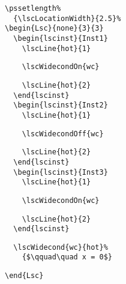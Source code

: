 \documentclass{article}
\begin{document}
\begin{center}%
\begin{minipage}{0.5\textwidth}
\end{minipage}
\hfill
\begin{minipage}{0.39\textwidth}%
\small%
{\gray\begin{verbatim}
\pssetlength%
  {\lscLocationWidth}{2.5}%
\begin{Lsc}{none}{3}{3}
  \begin{lscinst}{Inst1}
    \lscLine{hot}{1}
\end{verbatim}}%
\verbunskip%
{\begin{verbatim}
    \lscWidecondOn{wc}
\end{verbatim}}%
\verbunskip%
{\gray\begin{verbatim}
    \lscLine{hot}{2}
  \end{lscinst}
  \begin{lscinst}{Inst2}
    \lscLine{hot}{1}
\end{verbatim}}%
\verbunskip%
{\begin{verbatim}
    \lscWidecondOff{wc}
\end{verbatim}}%
\verbunskip%
{\gray\begin{verbatim}
    \lscLine{hot}{2}
  \end{lscinst}
  \begin{lscinst}{Inst3}
    \lscLine{hot}{1}
\end{verbatim}}%
\verbunskip%
{\begin{verbatim}
    \lscWidecondOn{wc}
\end{verbatim}}%
\verbunskip%
{\gray\begin{verbatim}
    \lscLine{hot}{2}
  \end{lscinst}
\end{verbatim}}%
\verbunskip%
{\begin{verbatim}
  \lscWidecond{wc}{hot}%
    {$\qquad\quad x = 0$}
\end{verbatim}}%
\verbunskip%
{\gray\begin{verbatim}
\end{Lsc}
\end{verbatim}}%
\end{minipage}
\end{center}%>@>
\end{document}
